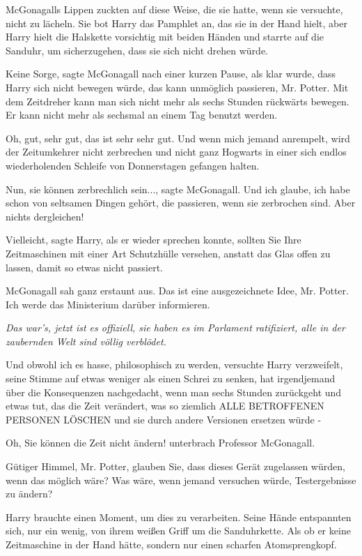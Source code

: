 McGonagalls Lippen zuckten auf diese Weise, die sie hatte, wenn sie versuchte,
nicht zu lächeln. Sie bot Harry das Pamphlet an, das sie in der Hand hielt, aber
Harry hielt die Halskette vorsichtig mit beiden Händen und starrte auf die
Sanduhr, um sicherzugehen, dass sie sich nicht drehen würde.

\glqq Keine Sorge\grqq{}, sagte McGonagall nach einer kurzen Pause, als klar
wurde, dass Harry sich nicht bewegen würde, \glqq das kann unmöglich passieren,
Mr. Potter. Mit dem Zeitdreher kann man sich nicht mehr als sechs Stunden
rückwärts bewegen. Er kann nicht mehr als sechsmal an einem Tag benutzt
werden.\grqq{}

\glqq Oh, gut, sehr gut, das ist sehr sehr gut. Und wenn mich jemand anrempelt,
wird der Zeitumkehrer nicht zerbrechen und nicht ganz Hogwarts in einer sich
endlos wiederholenden Schleife von Donnerstagen gefangen halten.\grqq{}

\glqq Nun, sie können zerbrechlich sein...\grqq{}, sagte McGonagall. \glqq Und
ich glaube, ich habe schon von seltsamen Dingen gehört, die passieren, wenn sie
zerbrochen sind. Aber nichts dergleichen!\grqq{}

\glqq Vielleicht\grqq{}, sagte Harry, als er wieder sprechen konnte, \glqq
sollten Sie Ihre Zeitmaschinen mit einer Art Schutzhülle versehen, anstatt das
Glas offen zu lassen, damit so etwas nicht passiert.\grqq{}

McGonagall sah ganz erstaunt aus. \glqq Das ist eine ausgezeichnete Idee, Mr.
Potter. Ich werde das Ministerium darüber informieren.\grqq{}

\emph{Das war's, jetzt ist es offiziell, sie haben es im Parlament ratifiziert,
alle in der zaubernden Welt sind völlig verblödet.}

\glqq Und obwohl ich es hasse, philosophisch zu werden\grqq{}, versuchte Harry
verzweifelt, seine Stimme auf etwas weniger als einen Schrei zu senken, \glqq
hat irgendjemand über die Konsequenzen nachgedacht, wenn man sechs Stunden
zurückgeht und etwas tut, das die Zeit verändert, was so ziemlich ALLE
BETROFFENEN PERSONEN LÖSCHEN und sie durch andere Versionen ersetzen würde
-\grqq{}

\glqq Oh, Sie können die Zeit nicht ändern!\grqq{} unterbrach Professor
McGonagall.

\glqq Gütiger Himmel, Mr. Potter, glauben Sie, dass dieses Gerät zugelassen
würden, wenn das möglich wäre? Was wäre, wenn jemand versuchen würde,
Testergebnisse zu ändern?\grqq{}

Harry brauchte einen Moment, um dies zu verarbeiten. Seine Hände entspannten
sich, nur ein wenig, von ihrem weißen Griff um die Sanduhrkette. Als ob er keine
Zeitmaschine in der Hand hätte, sondern nur einen scharfen Atomsprengkopf.

